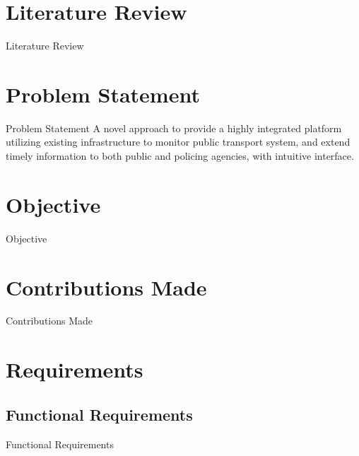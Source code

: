 \documentclass{beamer}
\begin{document}

\section{Literature Review}
\begin{frame}{Literature Review}
\end{frame}


\section{Problem Statement}
\begin{frame}{Problem Statement}
	A novel approach to provide a highly integrated platform utilizing existing infrastructure to monitor public transport system, and extend timely information to both public and policing agencies, with intuitive interface.
\end{frame}


\section{Objective}
\begin{frame}{Objective}
\end{frame}


\section{Contributions Made}
\begin{frame}{Contributions Made}
\end{frame}


\section{Requirements}
\subsection{Functional Requirements}
\begin{frame}{Functional Requirements}
\end{frame}
\end{document}
